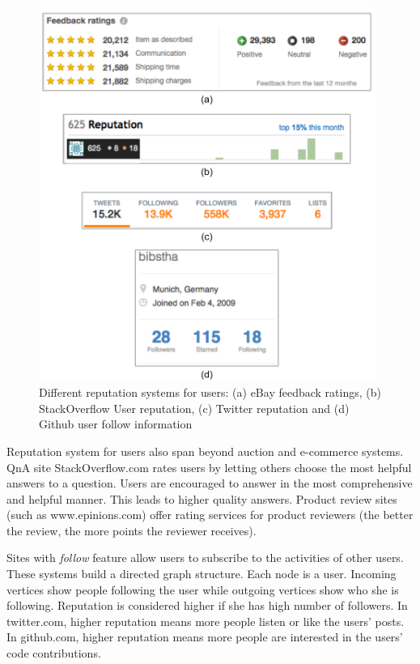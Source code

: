 \begin{figure}[!htb]
  \centering
  \includegraphics[width=11cm]{figures/rs_for_users.pdf} 
  \caption{Different reputation systems for users: (a) eBay feedback ratings, (b) StackOverflow User reputation, (c) Twitter reputation and (d) Github user follow information}
  \label{fig:rs_for_users}
\end{figure}

Reputation system for users also span beyond auction and e-commerce systems. QnA site  StackOverflow.com rates users by letting others choose the most helpful answers to a question. Users are encouraged to answer in the most comprehensive and helpful manner. This leads to higher quality answers. Product review sites (such as www.epinions.com) offer rating services for product reviewers (the better the review, the more points the reviewer receives).

Sites with \textit{follow} feature allow users to subscribe to the activities of other users. These systems build a directed graph structure. Each node is a user. Incoming vertices show people following the user while outgoing vertices show who she is following. Reputation is considered higher if she has high number of followers. In twitter.com, higher reputation means more people listen or like the users' posts. In github.com, higher reputation means more people are interested in the users' code contributions.

